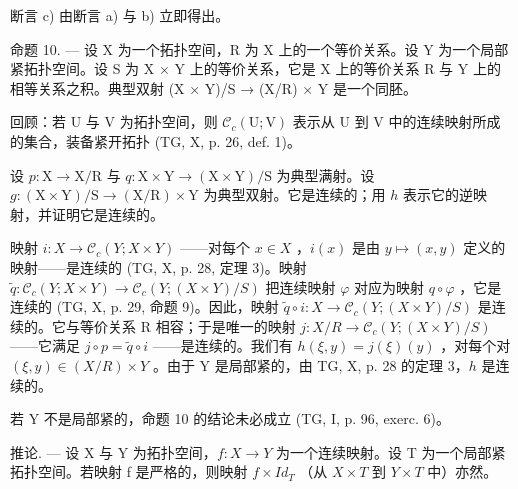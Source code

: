 断言 c) 由断言 a) 与 b) 立即得出。

命题 10. --- 设 X 为一个拓扑空间，R 为 X 上的一个等价关系。设 Y 为一个局部紧拓扑空间。设 S 为 X × Y 上的等价关系，它是 X 上的等价关系 R 与 Y 上的相等关系之积。典型双射 (X × Y)/S → (X/R) × Y 是一个同胚。

回顾：若 U 与 V 为拓扑空间，则 \(\mathcal{C}_{c}(\mathrm{U};\mathrm{V})\) 表示从 U 到 V 中的连续映射所成的集合，装备紧开拓扑 (TG, X, p. 26, def. 1)。

设 \(p \colon \mathrm{X} \to \mathrm{X} / \mathrm{R}\) 与 \(q \colon \mathrm{X} \times \mathrm{Y} \to (\mathrm{X} \times \mathrm{Y}) / \mathrm{S}\) 为典型满射。设 \(g \colon (\mathrm{X} \times \mathrm{Y}) / \mathrm{S} \to (\mathrm{X} / \mathrm{R}) \times \mathrm{Y}\) 为典型双射。它是连续的；用 \(h\) 表示它的逆映射，并证明它是连续的。

映射 \(i\colon X \to \mathcal{C}_{c}(Y;X \times Y)\) ——对每个 \(x \in X\) ，\(i(x)\) 是由 \(y \mapsto (x,y)\) 定义的映射——是连续的 (TG, X, p. 28, 定理 3)。映射 \(\widetilde{q}\colon \mathcal{C}_{c}(Y;X \times Y) \to \mathcal{C}_{c}(Y;(X \times Y)/S)\) 把连续映射 \(\varphi\) 对应为映射 \(q \circ \varphi\) ，它是连续的 (TG, X, p. 29, 命题 9)。因此，映射 \(\widetilde{q} \circ i\colon X \to \mathcal{C}_{c}(Y;(X \times Y)/S)\) 是连续的。它与等价关系 R 相容；于是唯一的映射 \(j\colon X/R \to \mathcal{C}_{c}(Y;(X \times Y)/S)\) ——它满足 \(j \circ p = \widetilde{q} \circ i\) ——是连续的。我们有 \(h(\xi,y) = j(\xi)(y)\) ，对每个对 \((\xi,y) \in (X/R) \times Y\) 。由于 Y 是局部紧的，由 TG, X, p. 28 的定理 3，\(h\) 是连续的。

若 Y 不是局部紧的，命题 10 的结论未必成立 (TG, I, p. 96, exerc. 6)。

推论. --- 设 X 与 Y 为拓扑空间，\(f: X \to Y\) 为一个连续映射。设 T 为一个局部紧拓扑空间。若映射 f 是严格的，则映射 \(f \times Id_{T}\) （从 \(X \times T\) 到 \(Y \times T\) 中）亦然。

